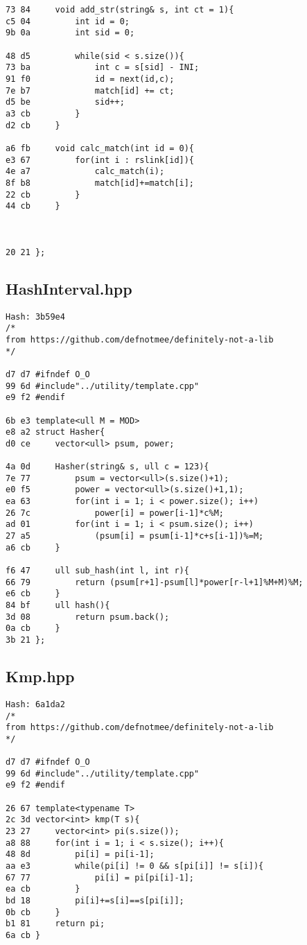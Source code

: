 \documentclass[11pt, a4paper, twoside]{article}
\begin{document}
\begin{lstlisting}
73 84     void add_str(string& s, int ct = 1){
c5 04         int id = 0;
9b 0a         int sid = 0;
      
48 d5         while(sid < s.size()){
73 ba             int c = s[sid] - INI;
91 f0             id = next(id,c);
7e b7             match[id] += ct;
d5 be             sid++;
a3 cb         }
d2 cb     }
      
a6 fb     void calc_match(int id = 0){
e3 67         for(int i : rslink[id]){
4e a7             calc_match(i);
8f b8             match[id]+=match[i];
22 cb         }
44 cb     }
      
      
      
20 21 };
\end{lstlisting}

\subsection{HashInterval.hpp}
\begin{lstlisting}
Hash: 3b59e4
/*
from https://github.com/defnotmee/definitely-not-a-lib
*/

d7 d7 #ifndef O_O
99 6d #include"../utility/template.cpp"
e9 f2 #endif

6b e3 template<ull M = MOD>
e8 a2 struct Hasher{
d0 ce     vector<ull> psum, power;
      
4a 0d     Hasher(string& s, ull c = 123){
7e 77         psum = vector<ull>(s.size()+1);
e0 f5         power = vector<ull>(s.size()+1,1);
ea 63         for(int i = 1; i < power.size(); i++)
26 7c             power[i] = power[i-1]*c%M;
ad 01         for(int i = 1; i < psum.size(); i++)
27 a5             (psum[i] = psum[i-1]*c+s[i-1])%=M;
a6 cb     }
      
f6 47     ull sub_hash(int l, int r){
66 79         return (psum[r+1]-psum[l]*power[r-l+1]%M+M)%M;
e6 cb     }
84 bf     ull hash(){
3d 08         return psum.back();
0a cb     }
3b 21 };
\end{lstlisting}

\subsection{Kmp.hpp}
\begin{lstlisting}
Hash: 6a1da2
/*
from https://github.com/defnotmee/definitely-not-a-lib
*/

d7 d7 #ifndef O_O
99 6d #include"../utility/template.cpp"
e9 f2 #endif

26 67 template<typename T>
2c 3d vector<int> kmp(T s){
23 27     vector<int> pi(s.size());
a8 88     for(int i = 1; i < s.size(); i++){
48 8d         pi[i] = pi[i-1];
aa e3         while(pi[i] != 0 && s[pi[i]] != s[i]){
67 77             pi[i] = pi[pi[i]-1];
ea cb         }
bd 18         pi[i]+=s[i]==s[pi[i]];
0b cb     }
b1 81     return pi;
6a cb }
\end{lstlisting}
\end{document}
